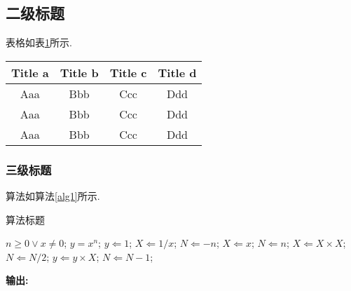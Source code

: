 \documentclass{SCIS2020cn}
\begin{document}
\subsection{二级标题}
表格如表\ref{tab1}所示.
\begin{table}[!t]
\label{tab1}
\footnotesize
\tabcolsep 49pt %
\begin{tabular*}{\textwidth}{cccc}
\toprule
  Title a & Title b & Title c & Title d \\\hline
  Aaa & Bbb & Ccc & Ddd\\
  Aaa & Bbb & Ccc & Ddd\\
  Aaa & Bbb & Ccc & Ddd\\
\bottomrule
\end{tabular*}
\end{table}

\subsubsection{三级标题}
算法如算法\ref{alg1}所示.
\begin{algorithm}
\renewcommand{\algorithmicrequire}{\textbf{输入:}}%
\renewcommand{\algorithmicensure}{\textbf{主迭代:}}%
\newcommand{\LASTCON}{\item[\algorithmiclastcon]}
\newcommand{\algorithmiclastcon}{\textbf{输出:}}%
\footnotesize
\caption{算法标题}
\label{alg1}
\begin{algorithmic}[1]
    \REQUIRE $n \geq 0 \vee x \neq 0$;
    \ENSURE $y = x^n$;
    \STATE $y \Leftarrow 1$;
        \STATE $X \Leftarrow 1 / x$;
        \STATE $N \Leftarrow -n$;
    \ELSE
        \STATE $X \Leftarrow x$;
        \STATE $N \Leftarrow n$;
    \ENDIF
            \STATE $X \Leftarrow X \times X$;
            \STATE $N \Leftarrow N / 2$;
        \ELSE[$N$ is odd]
            \STATE $y \Leftarrow y \times X$;
            \STATE $N \Leftarrow N - 1$;
        \ENDIF
    \ENDWHILE
    \LASTCON
\end{algorithmic}
\end{algorithm}


\end{document}
